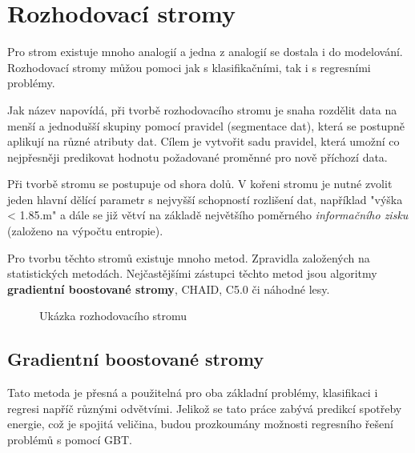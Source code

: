 \documentclass[FM,BP,fonts]{tulthesis}
\begin{document}
\newpage

\section{Rozhodovací stromy}
Pro strom existuje mnoho analogií a jedna z analogií se dostala i do modelování. Rozhodovací stromy můžou pomoci jak s klasifikačními, tak i s regresními problémy. 

Jak název napovídá, při tvorbě rozhodovacího stromu je snaha rozdělit data na menší a jednodušší skupiny pomocí pravidel (segmentace dat), která se postupně aplikují na různé atributy dat. Cílem je vytvořit sadu pravidel, která umožní co nejpřesněji predikovat hodnotu požadované proměnné pro nově příchozí data.

Při tvorbě stromu se postupuje od shora dolů. V kořeni stromu je nutné zvolit jeden hlavní dělící parametr s nejvyšší schopností rozlišení dat, například "výška < 1.85.m" a dále se již větví na základě největšího poměrného \textit{informačního zisku} (založeno na výpočtu entropie).  \cite{Tomsik2016thesis}

Pro tvorbu těchto stromů existuje mnoho metod. Zpravidla založených na statistických metodách. Nejčastějšími zástupci těchto metod jsou algoritmy \textbf{gradientní boostované stromy}, CHAID, C5.0 či náhodné lesy. \cite{Tomsik2016thesis}

\begin{figure}[htbp]
	\centering
	\caption{Ukázka rozhodovacího stromu}
	\label{fig:my_graph}
\end{figure}
\subsection{Gradientní boostované stromy}
Tato metoda je přesná a použitelná pro oba základní problémy, klasifikaci i regresi napříč různými odvětvími. Jelikož se tato práce zabývá predikcí spotřeby energie, což je spojitá veličina, budou prozkoumány možnosti regresního řešení problémů s pomocí GBT.
\end{document}
